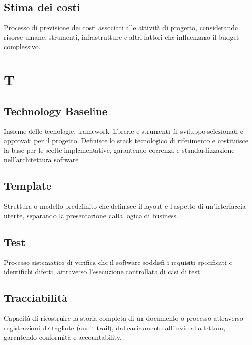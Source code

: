 \documentclass[a4paper,11pt]{article}
\begin{document}
\subsection{Stima dei costi}
Processo di previsione dei costi associati alle attività di progetto, considerando risorse umane, strumenti, infrastrutture e altri fattori che influenzano il budget complessivo.

\newpage









\section{T}

\subsection{Technology Baseline}
Insieme delle tecnologie, framework, librerie e strumenti di sviluppo selezionati e approvati per il progetto. Definisce lo stack tecnologico di riferimento e costituisce la base per le scelte implementative, garantendo coerenza e standardizzazione nell'architettura software.









\subsection{Template}
Struttura o modello predefinito che definisce il layout e l'aspetto di un'interfaccia utente, separando la presentazione dalla logica di business.









\subsection{Test}
Processo sistematico di verifica che il software soddisfi i requisiti specificati e identifichi difetti, attraverso l'esecuzione controllata di casi di test.





\subsection{Tracciabilità}
Capacità di ricostruire la storia completa di un documento o processo attraverso registrazioni dettagliate (audit trail), dal caricamento all'invio alla lettura, garantendo conformità e accountability.
\end{document}
